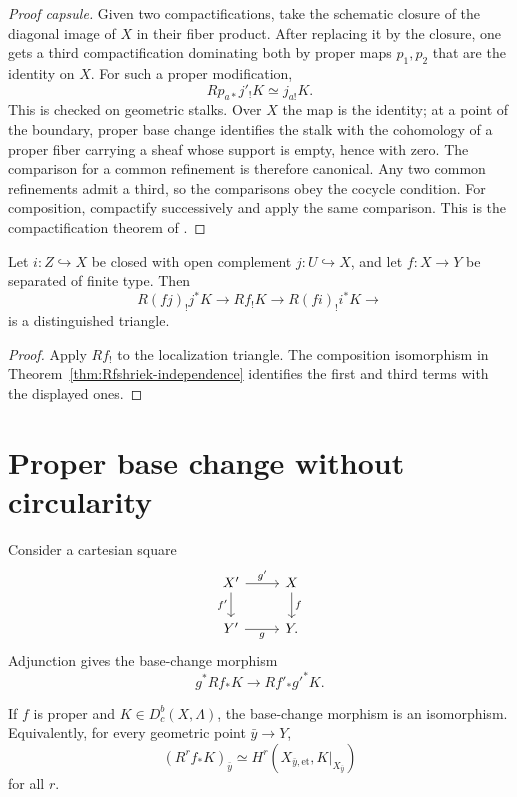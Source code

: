 \begin{proof}[Proof capsule]
Given two compactifications, take the schematic closure of the diagonal image
of \(X\) in their fiber product.  After replacing it by the closure, one gets
a third compactification dominating both by proper maps \(p_1,p_2\) that are
the identity on \(X\).  For such a proper modification,
\[
  Rp_{a*}j'_!K\simeq j_{a!}K.
\]
This is checked on geometric stalks.  Over \(X\) the map is the identity; at a
point of the boundary, proper base change identifies the stalk with the
cohomology of a proper fiber carrying a sheaf whose support is empty, hence
with zero.  The comparison for a common refinement is therefore canonical.
Any two common refinements admit a third, so the comparisons obey the cocycle
condition.  For composition, compactify successively and apply the same
comparison.  This is the compactification theorem of
\cite[Expos\'e XVII]{SGA4}.
\end{proof}

\begin{proposition}
\label{prop:six-localization}
Let \(i:Z\hookrightarrow X\) be closed with open complement \(j:U\hookrightarrow
X\), and let \(f:X\to Y\) be separated of finite type.  Then
\[
  R(fj)_!j^*K\longrightarrow Rf_!K
  \longrightarrow R(fi)_!i^*K\longrightarrow
\]
is a distinguished triangle.
\end{proposition}

\begin{proof}
Apply \(Rf_!\) to the localization triangle.  The composition isomorphism in
Theorem~\ref{thm:Rfshriek-independence} identifies the first and third terms
with the displayed ones.
\end{proof}

\section{Proper base change without circularity}

Consider a cartesian square
\[
\begin{tikzcd}
X' \arrow[r,"g'"] \arrow[d,"f'"'] & X \arrow[d,"f"]\\
Y' \arrow[r,"g"'] & Y .
\end{tikzcd}
\]
Adjunction gives the base-change morphism
\[
  g^*Rf_*K\longrightarrow Rf'_*g'^*K.
\]

\begin{theorem}
\label{thm:proper-base-change-torsion}
If \(f\) is proper and \(K\in D^b_c(X,\Lambda)\), the base-change morphism is
an isomorphism.  Equivalently, for every geometric point \(\bar y\to Y\),
\[
  (R^rf_*K)_{\bar y}
   \simeq
  H^r(X_{\bar y,\mathrm{et}},K|_{X_{\bar y}})
\]
for all \(r\).
\end{theorem}

